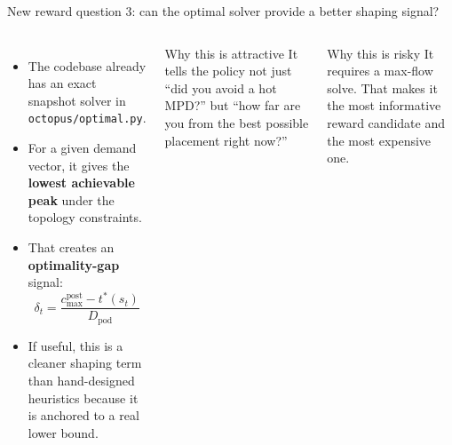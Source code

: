 \documentclass[11pt,aspectratio=43]{beamer}
\begin{document}
\begin{frame}[shrink=3]{New reward question 3: can the optimal solver provide a better shaping signal?}

  \begin{columns}[T,onlytextwidth]
      \begin{itemize}
        \setlength{\itemsep}{0.7em}
        \item The codebase already has an exact snapshot solver in \texttt{octopus/optimal.py}.
        \item For a given demand vector, it gives the \textbf{lowest achievable peak} under the topology constraints.
        \item That creates an \textbf{optimality-gap} signal:
        \[
          \delta_t = \frac{c_{\max}^{\text{post}} - t^*(s_t)}{D_{\text{pod}}}
        \]
        \item If useful, this is a cleaner shaping term than hand-designed heuristics because it is anchored to a real lower bound.
      \end{itemize}

      \begin{block}{Why this is attractive}
        \small
        It tells the policy not just ``did you avoid a hot MPD?'' but ``how far are you from the best possible placement right now?''
      \end{block}

      \vspace{0.5em}
      \begin{block}{Why this is risky}
        \small
        It requires a max-flow solve.
        That makes it the most informative reward candidate and the most expensive one.
      \end{block}
  \end{columns}

\end{frame}

\end{document}
